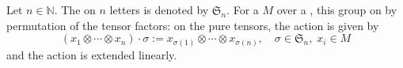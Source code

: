 \begin{definition} \label{definition:action_of_symmetric_group_on_tensor_power_on_a_two_sided_over_a_ring}
Let $n \in \mathbb{N}$. The  on $n$ letters is denoted by $\mathfrak{S}_n$.  
For a  $M$ over a , this group  on  by permutation of the tensor factors: on the pure tensors, the action is given by
$$ (x_1 \otimes \cdots \otimes x_n) \cdot \sigma := x_{\sigma(1)} \otimes \cdots \otimes x_{\sigma(n)}, \quad \sigma \in \mathfrak{S}_n, \; x_i \in M $$
and the action is extended linearly.
\end{definition}